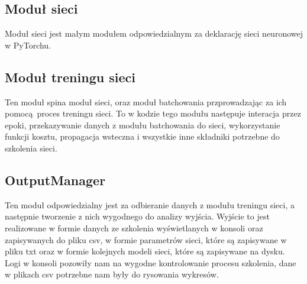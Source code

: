 \subsection{Moduł sieci} 
Moduł sieci jest małym modułem odpowiedzialnym za deklarację sieci neuronowej w PyTorchu.
 
\subsection{Moduł treningu sieci}
Ten moduł spina moduł sieci, oraz moduł batchowania przprowadzając za ich pomocą proces treningu sieci.
To w kodzie tego modułu następuje interacja przez epoki, przekazywanie danych z modułu batchowania 
do sieci, wykorzystanie funkcji kosztu, propagacja wsteczna i wszystkie inne składniki potrzebne do 
szkolenia sieci. 

\subsection{OutputManager}
Ten moduł odpowiedzialny jest za odbieranie danych z modułu treningu sieci, a następnie tworzenie z nich
wygodnego do analizy wyjścia. Wyjście to jest realizowane w formie danych ze szkolenia wyświetlanych 
w konsoli oraz zapisywanych do pliku csv, w formie parametrów sieci, które są zapisywane
w pliku txt oraz w formie kolejnych modeli sieci, które są zapisywane na dysku. 
Logi w konsoli pozowiły nam na wygodne kontrolowanie procesu szkolenia, dane w plikach csv potrzebne 
nam były do rysowania wykresów.

